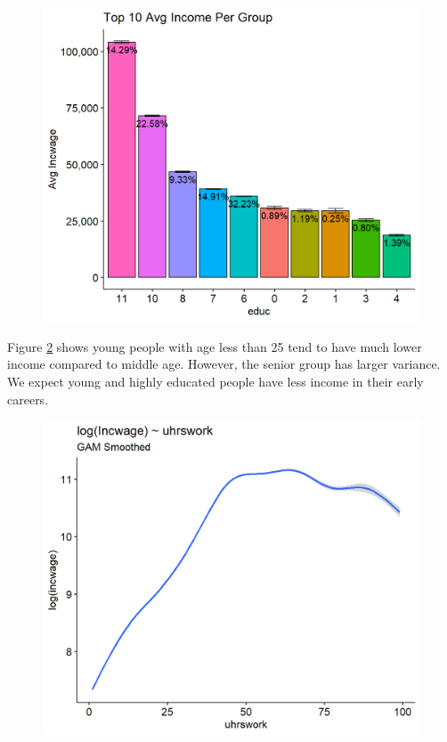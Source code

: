 \documentclass[11pt, letter,twocolumn]{article}
\begin{document}
\begin{figure}[ht]
	\centering
		\caption{}
	\includegraphics[width=0.9\linewidth]{imgs/incwage_educ}
		\label{fig:incwageeduc}
\end{figure}

Figure \ref{fig:incwageage} shows young people with age less than 25 tend to have much lower income compared to middle age. However, the senior group has larger variance. We expect young and highly educated people have less income in their early careers.

\begin{figure}[ht]
	\centering
	\caption{ }
	\includegraphics[width=0.9\linewidth]{imgs/incwage_age}
		\label{fig:incwageage}
\end{figure}
\end{document}
